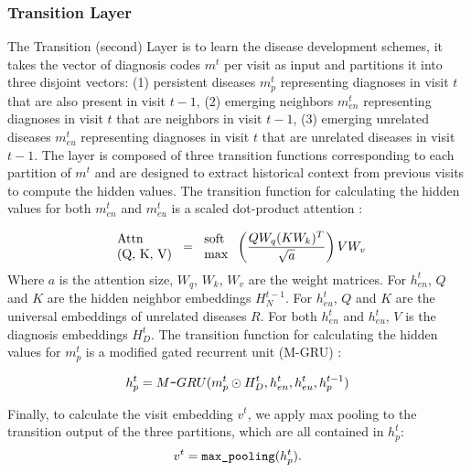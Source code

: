 \documentclass[11pt,a4paper,fleqn]{article}
\begin{document}
\subsubsection{Transition Layer}
The Transition (second) Layer is to learn the disease development schemes, it
takes the vector of diagnosis codes $m^t$ per visit as input and partitions it
into three disjoint vectors: (1) persistent diseases $m_p^t$ representing
diagnoses in visit $t$ that are also present in visit $t-1$, (2) emerging
neighbors $m_{en}^t$ representing diagnoses in visit $t$ that are neighbors in
visit $t-1$, (3) emerging unrelated diseases $m_{eu}^t$ representing diagnoses
in visit $t$ that are unrelated diseases in visit $t-1$. The layer is composed
of three transition functions corresponding to each partition of $m^t$ and are
designed to extract historical context from previous visits to compute the
hidden values. The transition function for calculating the hidden values for
both $m_{en}^t$ and $m_{eu}^t$ is a scaled dot-product attention
\cite{dp_attention}: 

\begin{equation}
\begin{tabular}{l}
Attn \\ (Q, K, V) 
\end{tabular}
=
\begin{tabular}{l}
  soft \\
  max
\end{tabular}\left(\frac{QW_q(KW_k)^T}{\sqrt{a}}\right)VW_v 
\end{equation}
\normalsize
Where $a$ is the attention size, $W_q$, $W_k$, $W_v$ are the weight matrices.
For $h_{en}^t$, $Q$ and $K$ are the hidden neighbor embeddings $H_N^{t-1}$. For
$h_{eu}^t$, $Q$ and $K$ are the universal embeddings of unrelated diseases $R$.
For both $h_{en}^t$ and $h_{eu}^t$, $V$ is the diagnosis embeddings $H^{t}_D$.
The transition function for calculating the hidden values for $m_p^t$ is a
modified gated recurrent unit (M-GRU) \cite{gru}:

\begin{equation}
  h_p^t = {M\verb|-|GRU}(m_p^t \odot H_D^t , h_{en}^t, h_{eu}^t, h_p^{t-1})
\end{equation}

Finally, to calculate the visit embedding $v^t$, we apply max pooling to the
transition output of the three partitions, which are all contained in $h_p^t$:
\begin{equation}
  v^t = \verb|max_pooling|(h_p^t).
\end{equation}
\end{document}
